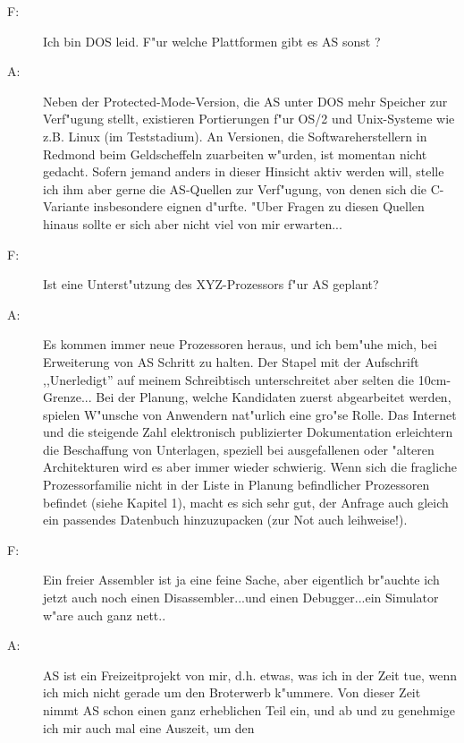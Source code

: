 \documentclass[12pt,a4paper,twoside]{report}
\newcommand{\asname}{AS}
\begin{document}
\begin{description}
\item[F:]{Ich bin DOS leid.  F"ur welche Plattformen gibt es \asname{} sonst ?}
\item[A:]{Neben der Protected-Mode-Version, die \asname{} unter DOS mehr Speicher
         zur Verf"ugung stellt, existieren Portierungen f"ur OS/2 und
         Unix-Systeme wie z.B. Linux (im Teststadium).  An Versionen,
         die Softwareherstellern in Redmond beim Geldscheffeln zuarbeiten
         w"urden, ist momentan nicht gedacht.  Sofern jemand anders in
         dieser Hinsicht aktiv werden will, stelle ich ihm aber gerne
         die \asname{}-Quellen zur Verf"ugung, von denen sich die C-Variante
         insbesondere eignen d"urfte.  "Uber Fragen zu diesen Quellen
         hinaus sollte er sich aber nicht viel von mir erwarten...}
\vspace{0.3cm}
\item[F:]{Ist eine Unterst"utzung des XYZ-Prozessors f"ur \asname{} geplant?}
\item[A:]{Es kommen immer neue Prozessoren heraus, und ich bem"uhe
         mich, bei Erweiterung von \asname{} Schritt zu halten.  Der Stapel
         mit der Aufschrift ,,Unerledigt'' auf meinem Schreibtisch
         unterschreitet aber selten die 10cm-Grenze... Bei der Planung,
         welche Kandidaten zuerst abgearbeitet werden, spielen W"unsche
         von Anwendern nat"urlich eine gro"se Rolle.  Das Internet und
         die steigende Zahl elektronisch publizierter Dokumentation
         erleichtern die Beschaffung von Unterlagen, speziell bei
         ausgefallenen oder "alteren Architekturen wird es aber immer
         wieder schwierig.  Wenn sich die fragliche Prozessorfamilie
         nicht in der Liste in Planung befindlicher Prozessoren
         befindet (siehe Kapitel 1), macht es sich sehr gut, der
         Anfrage auch gleich ein passendes Datenbuch hinzuzupacken
         (zur Not auch leihweise!).}
\vspace{0.3cm}
\item[F:]{Ein freier Assembler ist ja eine feine Sache, aber eigentlich
         br"auchte ich jetzt auch noch einen Disassembler...und einen
         Debugger...ein Simulator w"are auch ganz nett..}
\item[A:]{\asname{} ist ein Freizeitprojekt von mir, d.h. etwas, was ich in der
         Zeit tue, wenn ich mich nicht gerade um den Broterwerb k"ummere.
         Von dieser Zeit nimmt \asname{} schon einen ganz erheblichen Teil ein,
         und ab und zu genehmige ich mir auch mal eine Auszeit, um den
}
\end{description}
\end{document}
